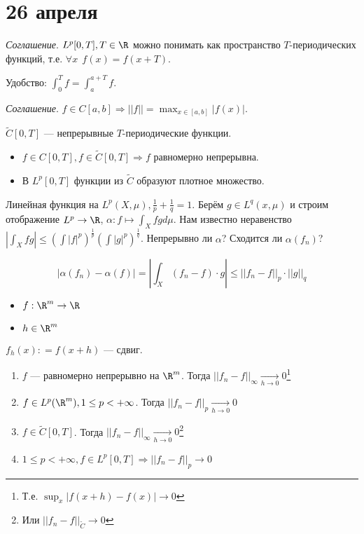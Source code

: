 \chapter{26 апреля}

\textit{Соглашение}. \(L^p[0, T], T\in\R\) можно понимать как пространство \(T\)-периодических функций, т.е. \(\forall x \ \ f(x) = f(x + T)\).

\? %

Удобство: \(\int_0^T f = \int_a^{a + T} f\).

\textit{Соглашение}. \(f \in C[a, b] \Rightarrow ||f|| = \max_{x\in[a,b]} |f(x)|\).

\(\widetilde{C}[0, T]\) --- непрерывные \(T\)-периодические функции.
\begin{itemize}
    \item \(f \in C[0, T], f \in \widetilde{C}[0, T] \Rightarrow f\) равномерно непрерывна.
    \item В \(L^p[0, T]\) функции из \(\widetilde{C}\) образуют плотное множество.
\end{itemize}

Линейная функция на \(L^p(X, \mu), \frac{1}{p} + \frac{1}{q} = 1\). Берём \(g \in L^q(x, \mu)\) и строим отображение \(L^p \to \R\), \(\alpha : f \mapsto \int_X fg d\mu\). Нам известно неравенство \(|\int_X fg| \leq (\int |f|^p)^{\frac{1}{p}} (\int |g|^p)^{\frac{1}{q}}\). Непрерывно ли \(\alpha\)? Сходится ли \(\alpha(f_n)\)?

\[|\alpha(f_n) - \alpha(f)| = \left|\int_X (f_n - f) \cdot g\right| \leq ||f_n - f||_p \cdot ||g||_q\]

\begin{definition}\itemfix
    \begin{itemize}
        \item \(f : \R^m \to \R\)
        \item \(h \in \R^m\)
    \end{itemize}

    \(f_h(x) : = f(x + h)\) --- сдвиг.
\end{definition}

\begin{theorem}\itemfix
    \begin{enumerate}
        \item \(f\) --- равномерно непрерывно на \(\R^m\). Тогда \(||f_n - f||_{\infty} \xrightarrow[h \to 0]{} 0\)\footnote{Т.е. \(\sup_x |f(x + h) - f(x)| \to 0\)}
        \item \(f \in L^p(\R^m), 1 \leq p < +\infty\). Тогда \(||f_n - f||_p \xrightarrow[h \to 0]{} 0\)
        \item \(f \in \widetilde{C}[0, T]\). Тогда \(||f_n - f||_{\infty} \xrightarrow[h \to 0]{} 0\)\footnote{Или \(||f_n - f||_{\widetilde{C}} \to 0\)}
        \item \(1 \leq p < +\infty, f \in L^p[0, T] \Rightarrow ||f_n - f||_p \to 0\)
    \end{enumerate}
\end{theorem}

